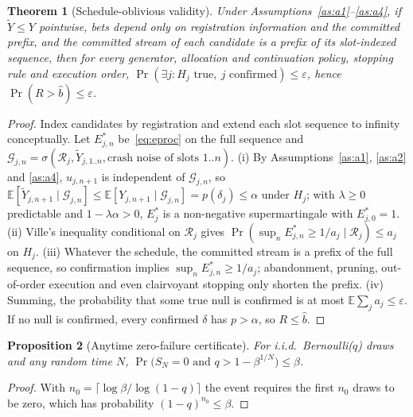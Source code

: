 \documentclass[11pt]{article}
\newtheorem{theorem}{Theorem}
\newtheorem{proposition}[theorem]{Proposition}
\theoremstyle{definition}
\theoremstyle{remark}
\newcommand{\E}{\mathbb{E}}
\newcommand{\Prob}{\Pr}
\newcommand{\bhat}{\hat b}
\begin{document}
\begin{theorem}[Schedule-oblivious validity]\label{thm:lexis}
Under Assumptions~\ref{as:a1}--\ref{as:a4}, if $\tilde Y\le Y$ pointwise, bets depend only on registration information and the committed prefix, and the committed stream of each candidate is a prefix of its slot-indexed sequence, then for every generator, allocation and continuation policy, stopping rule and execution order, $\Prob(\exists j: H_j\text{ true},\ j\text{ confirmed})\le\varepsilon$, hence $\Prob(R>\bhat)\le\varepsilon$.
\end{theorem}
\begin{proof}
Index candidates by registration and extend each slot sequence to infinity conceptually. Let $E^*_{j,n}$ be~\eqref{eq:eproc} on the full sequence and $\mathcal G_{j,n}=\sigma(\mathcal R_j,\tilde Y_{j,1..n},\text{crash noise of slots }1..n)$. (i) By Assumptions~\ref{as:a1}, \ref{as:a2} and \ref{as:a4}, $u_{j,n+1}$ is independent of $\mathcal G_{j,n}$, so $\E[\tilde Y_{j,n+1}\mid\mathcal G_{j,n}]\le\E[Y_{j,n+1}\mid\mathcal G_{j,n}]=p(\delta_j)\le\alpha$ under $H_j$; with $\lambda\ge0$ predictable and $1-\lambda\alpha>0$, $E^*_j$ is a non-negative supermartingale with $E^*_{j,0}=1$. (ii) Ville's inequality conditional on $\mathcal R_j$ gives $\Prob(\sup_n E^*_{j,n}\ge1/a_j\mid\mathcal R_j)\le a_j$ on $H_j$. (iii) Whatever the schedule, the committed stream is a prefix of the full sequence, so confirmation implies $\sup_nE^*_{j,n}\ge1/a_j$; abandonment, pruning, out-of-order execution and even clairvoyant stopping only shorten the prefix. (iv) Summing, the probability that some true null is confirmed is at most $\E\sum_ja_j\le\varepsilon$. If no null is confirmed, every confirmed $\delta$ has $p>\alpha$, so $R\le\bhat$.
\end{proof}

\begin{proposition}[Anytime zero-failure certificate]\label{prop:zf}
For i.i.d.\ Bernoulli($q$) draws and any random time $N$, $\Prob\bigl(S_N=0\text{ and }q>1-\beta^{1/N}\bigr)\le\beta$.
\end{proposition}
\begin{proof}
With $n_0=\lceil\log\beta/\log(1-q)\rceil$ the event requires the first $n_0$ draws to be zero, which has probability $(1-q)^{n_0}\le\beta$.
\end{proof}
\end{document}
